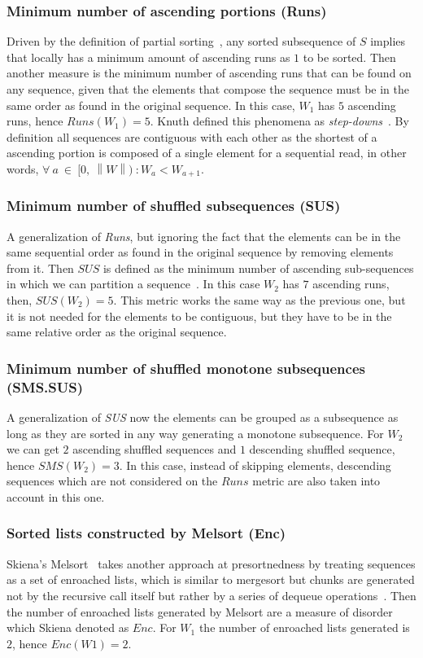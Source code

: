\subsubsection{Minimum number of ascending portions (Runs)}
Driven by the definition of partial sorting~\cite{10.5555/1614191}, any sorted subsequence of $S$ implies that locally has a minimum amount of ascending runs as $1$ to be sorted. Then another measure is the minimum number of ascending runs that can be found on any sequence, given that the elements that compose the sequence must be in the same order as found in the original sequence. In this case, $W_1$ has $5$ ascending runs, hence $Runs(W_1) =5$. Knuth defined this phenomena as \textit{step-downs}~\cite{10.5555/270146}. By definition all sequences are contiguous with each other as the shortest of a ascending portion is composed of a single element for a sequential read, in other words, $\forall~a~\in~[0,~\left\|W\right\|)~: W_a < W_{a+1}$.

\subsubsection{Minimum number of shuffled subsequences (SUS)}
A generalization of \textit{Runs}, but ignoring the fact that the elements can be in the same sequential order as found in the original sequence by removing elements from it. Then $SUS$ is defined as the minimum number of ascending sub-sequences in which we can partition a sequence~\cite{Carlsson_Levcopoulos_Petersson_1993}. In this case $W_2$ has $7$ ascending runs, then, $SUS(W_2) = 5$. This metric works the same way as the previous one, but it is not needed for the elements to be contiguous, but they have to be in the same relative order as the original sequence.


\subsubsection{Minimum number of shuffled monotone subsequences (SMS.SUS)}
A generalization of \textit{SUS} now the elements can be grouped as a subsequence as long as they are sorted in any way generating a monotone subsequence. For $W_2$ we can get $2$ ascending shuffled sequences\cite{Carlsson_Levcopoulos_Petersson_1993} and $1$ descending shuffled sequence, hence $SMS(W_2) = 3$. In this case, instead of skipping elements, descending sequences which are not considered on the $Runs$ metric are also taken into account in this one.


\subsubsection{Sorted lists constructed by Melsort (Enc)}
Skiena's Melsort~\cite{Skiena_1988} takes another approach at presortnedness by treating sequences as a set of enroached lists, which is similar to mergesort but chunks are generated not by the recursive call itself but rather by a series of dequeue operations~\cite{Baeza-Yates_Manber_1992}. Then the number of enroached lists generated by Melsort are a measure of disorder which Skiena denoted as $Enc$. For $W_1$ the number of enroached lists generated is $2$, hence $Enc(W1)=2$.

